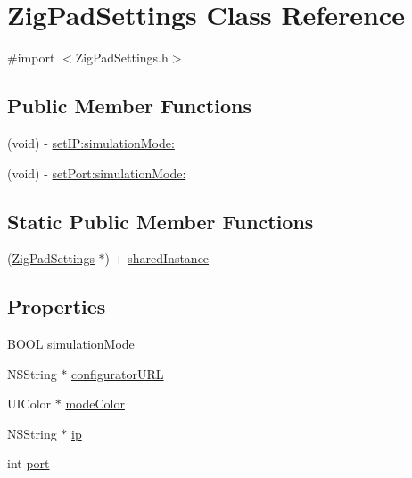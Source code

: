\hypertarget{interface_zig_pad_settings}{
\section{ZigPadSettings Class Reference}
\label{interface_zig_pad_settings}
}


{\ttfamily \#import $<$ZigPadSettings.h$>$}

\subsection*{Public Member Functions}
\begin{DoxyCompactItemize}
\item 
(void) -\/ \hyperlink{interface_zig_pad_settings_a510ae0a55f24da67a68e8758252ccfda}{setIP:simulationMode:}
\item 
(void) -\/ \hyperlink{interface_zig_pad_settings_a35d36542dd82b12e24791819092906c5}{setPort:simulationMode:}
\end{DoxyCompactItemize}
\subsection*{Static Public Member Functions}
\begin{DoxyCompactItemize}
\item 
(\hyperlink{interface_zig_pad_settings}{ZigPadSettings} $\ast$) + \hyperlink{interface_zig_pad_settings_a62b9daa68893a19f9b6a6737fb8f875a}{sharedInstance}
\end{DoxyCompactItemize}
\subsection*{Properties}
\begin{DoxyCompactItemize}
\item 
BOOL \hyperlink{interface_zig_pad_settings_ab314ed8d97474bb5391236ced665bd3b}{simulationMode}
\item 
NSString $\ast$ \hyperlink{interface_zig_pad_settings_a3b2dbac08a4748cccf3aea0c3f557fd4}{configuratorURL}
\item 
UIColor $\ast$ \hyperlink{interface_zig_pad_settings_a22b7a43d44d562d77d8534e46db89fe1}{modeColor}
\item 
NSString $\ast$ \hyperlink{interface_zig_pad_settings_ad56edd22bf5c939f2931577a179b55ab}{ip}
\item 
int \hyperlink{interface_zig_pad_settings_a63c89c04d1feae07ca35558055155ffb}{port}
\end{DoxyCompactItemize}


